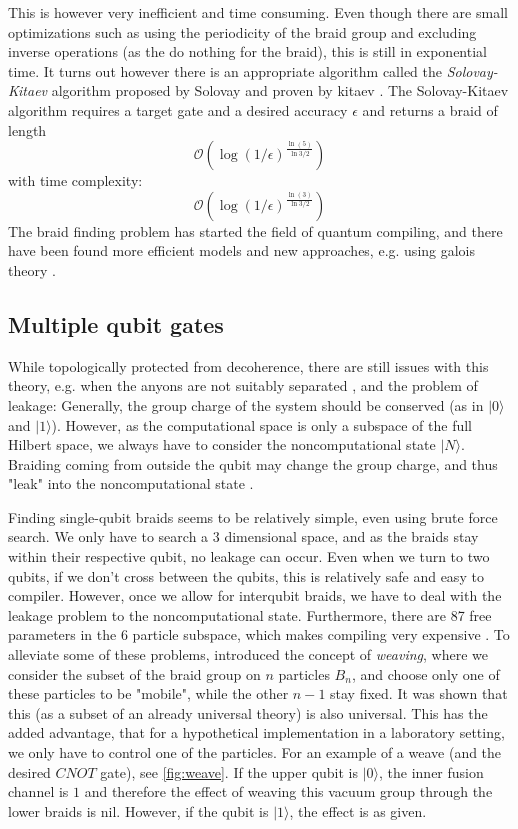 \documentclass{article}
\begin{document}
This is however very inefficient and  time consuming. Even though there are small optimizations such as using the periodicity of the braid group and excluding inverse operations (as the do nothing for the braid), this is still in exponential time. It turns out however there is an appropriate algorithm called the {\it Solovay-Kitaev} algorithm \cite{bonesteel_braid_2005}\cite{dawson_solovay-kitaev_2005} proposed by Solovay \cite{solovay_email} and proven by kitaev \cite{kitaev_fault-tolerant_1997}. The Solovay-Kitaev algorithm requires a target gate and a desired accuracy $\epsilon $ and returns a braid of length 
\[
  \mathcal{O}\left( \log(1 / \epsilon )^{\frac{\ln(5)}{\ln{3 / 2}}}\right)
\]
with time complexity:
\[
  \mathcal{O}\left( \log(1 / \epsilon )^{\frac{\ln(3)}{\ln{3 / 2}}}\right)
\]
The braid finding problem has started the field of quantum compiling, and there have been found more efficient models and new approaches, e.g. using galois theory \cite{kliuchnikov_asymptotically_2014}.

\subsection{Multiple qubit gates}

While topologically protected from decoherence, there are still issues with this theory, e.g. when the anyons are not suitably separated \cite{hormozi_topological_2007}, and the problem of leakage: Generally, the group charge of the system should be conserved (as in $\vert 0 \rangle$ and $\vert 1 \rangle$). However, as the computational space is only a subspace of the full Hilbert space, we always have to consider the noncomputational state $\vert N \rangle$. Braiding coming from outside the qubit may change the group charge, and thus "leak" into the noncomputational state \cite{ainsworth_topological_2011}.

Finding single-qubit braids seems to be relatively simple, even using brute force search. We only have to search a $3$ dimensional space, and as the braids stay within their respective qubit, no leakage can occur. Even when we turn to two qubits, if we don't cross between the qubits, this is relatively safe and easy to compiler. However, once we allow for interqubit braids, we have to deal with the leakage problem to the noncomputational state. Furthermore, there are 87 free parameters in the $6$ particle subspace, which makes compiling very expensive \cite{hormozi_topological_2007}. To alleviate some of these problems, \cite{simon_topological_2006} introduced the concept of {\it weaving}, where we consider the subset of the braid group on $n$ particles $B_n$, and choose only one of these particles to be "mobile", while the other $n-1$ stay fixed. It was shown that this (as a subset of an already universal theory) is also universal. This has the added advantage, that for a hypothetical implementation in a laboratory setting, we only have to control one of the particles. For an example of a weave (and the desired $CNOT$ gate), see \cref{fig:weave}. If the upper qubit is $\vert 0 \rangle$, the inner fusion channel is $1$ and therefore the effect of weaving this vacuum group through the lower braids is nil. However, if the qubit is $\vert 1 \rangle$, the effect is as given.
\end{document}
